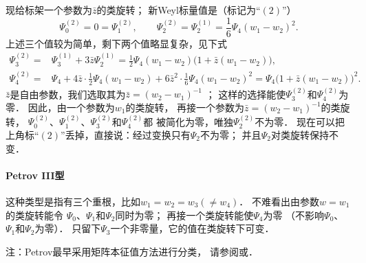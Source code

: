 现给标架一个参数为$\bar{z}$的类旋转；
新Weyl标量值是（标记为“$(2)$”）
\begin{equation}
    \Psi_0^{(2)}= 0=\Psi_1^{(2)},\qquad
    \Psi_2^{(2)}=\Psi_2^{(1)}=\frac{1}{6}\Psi_4 (w_1-w_2)^2 .
\end{equation}
上述三个值较为简单，剩下两个值略显复杂，见下式
\begin{align*}
        \Psi_3^{(2)}=&\Psi_3^{(1)}  +  3 \bar{z} \Psi_2^{(1)}
        =\frac{1}{2}\Psi_4 (w_1 - w_2)\bigl(1+\bar{z}(w_1 - w_2)\bigr), \\
        \Psi_4^{(2)}=& \Psi_4 + 4\bar{z}\cdot
        \frac{1}{2}\Psi_4 (w_1 - w_2) + 6\bar{z}^2 \cdot
        \frac{1}{6}\Psi_4 (w_1 - w_2)^2
        =\Psi_4 \bigl(1+ \bar{z}(w_1 - w_2)\bigr)^2 .
\end{align*} %
$\bar{z}$是自由参数，我们选取其为$\bar{z}= (w_2-w_1)^{-1}$ ；
这样的选择能使$\Psi_3^{(2)}$和$\Psi_4^{(2)}$为零．
因此，由一个参数为$w_1$的类旋转，
再接一个参数为$\bar{z}= (w_2-w_1)^{-1}$的类旋转，
$\Psi_0^{(2)}$、$\Psi_1^{(2)}$、$\Psi_3^{(2)}$和$\Psi_4^{(2)}$都
被简化为零，唯独$\Psi_2^{(2)}$不为零．
现在可以把上角标“$(2)$”丢掉，直接说：经过变换只有$\Psi_2$不为零；
并且$\Psi_2$对类旋转保持不变．



\paragraph{Petrov III型}
这种类型是指有三个重根，比如$w_1=w_2=w_3(\neq w_4)$．
不难看出由参数$w=w_1$的类旋转能令
$\Psi_0$、$\Psi_1$和$\Psi_2$同时为零；
再接一个类旋转能使$\Psi_4$为零
（不影响$\Psi_0$、$\Psi_1$和$\Psi_2$为零）．
只留下$\Psi_3$一个非零量，它的值在类旋转下可变．













{\kaishu 
注：Petrov最早采用矩阵本征值方法进行分类，
请参阅\parencite[\S 4.1-4.2]{stephani-exe-2003}或\parencite[\S 3.2]{Luqk-2026}．
}




